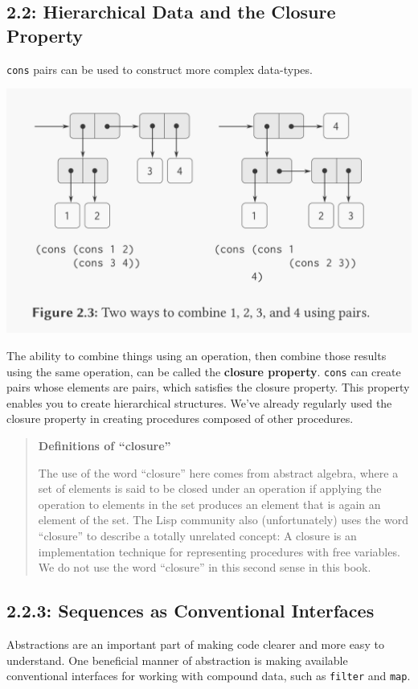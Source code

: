 \documentclass[final,fleqn,titlepage]{article}
\begin{document}
\subsection{2.2: Hierarchical Data and the Closure Property}
\label{sec:org4fb1c80}
\texttt{cons} pairs can be used to construct more complex data-types.

\begin{center}
\includegraphics[width=.9\linewidth]{2/cons-cells.jpeg}
\end{center}

The ability to combine things using an operation, then combine those results
using the same operation, can be called the \textbf{closure property}. \texttt{cons} can
create pairs whose elements are pairs, which satisfies the closure property.
This property enables you to create hierarchical structures. We've already
regularly used the closure property in creating procedures composed of other
procedures.

\begin{quote}
\textbf{Definitions of ``closure''}

The use of the word ``closure'' here comes from abstract algebra, where a set of
elements is said to be closed under an operation if applying the operation to
elements in the set produces an element that is again an element of the set.
The Lisp community also (unfortunately) uses the word ``closure'' to describe a
totally unrelated concept: A closure is an implementation technique for
representing procedures with free variables. We do not use the word ``closure''
in this second sense in this book.
\end{quote}

\subsection{2.2.3: Sequences as Conventional Interfaces}
\label{sec:org054a52a}
Abstractions are an important part of making code clearer and more easy to
understand. One beneficial manner of abstraction is making available
conventional interfaces for working with compound data, such as \texttt{filter} and
\texttt{map}.
\end{document}
